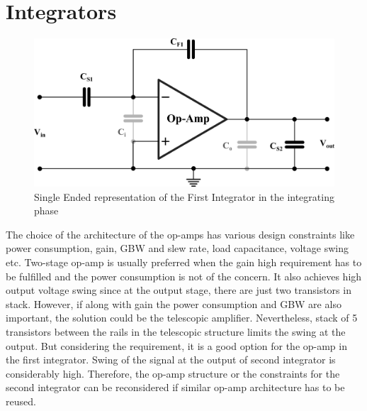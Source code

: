 \section{Integrators}
%
\begin{figure}[ht]
\centering
\includegraphics[width=0.6\columnwidth]{Chap05/Figures/integrator.png}
\caption{Single Ended representation of the First Integrator in the integrating phase}
\label{INT1_INTPHS}
\end{figure}
%
The choice of the architecture of the op-amps has various design constraints like power consumption, gain, GBW and slew rate, load capacitance, voltage swing etc. Two-stage op-amp is usually preferred when the gain high requirement has to be fulfilled and the power consumption is not of the concern. It also achieves high output voltage swing since at the output stage, there are just two transistors in stack. However, if along with gain the power consumption and GBW are also important, the solution could be the telescopic amplifier. Nevertheless, stack of 5 transistors between the rails in the telescopic structure limits the swing at the output. But considering the requirement, it is a good option for the op-amp in the first integrator. Swing of the signal at the output of second integrator is considerably high. Therefore, the op-amp structure or the constraints for the second integrator can be reconsidered if similar op-amp architecture has to be reused.

